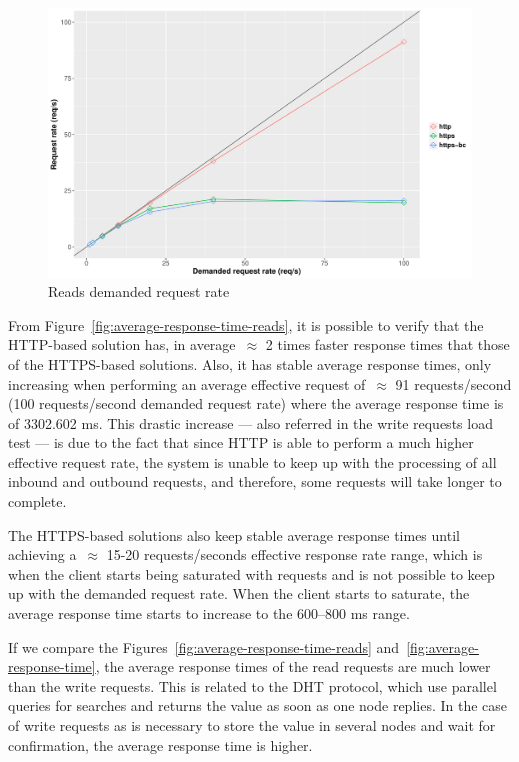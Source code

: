 \begin{figure}[h!]
  \centering
  \includegraphics[scale=0.4]{Figures/evaluation/request-rate-reads-linear-new.pdf}
  \caption{Reads demanded request rate}
  \label{fig:demanded-request-rate-reads}
\end{figure}

From Figure~\ref{fig:average-response-time-reads}, it is possible to verify that the HTTP-based solution has, in average~$\approx$ 2 times faster response times that those of the HTTPS-based solutions.
Also, it has stable average response times, only increasing when performing an average effective request of~$\approx$ 91 requests/second (100 requests/second demanded request rate) where the average response time is of 3302.602 ms.
This drastic increase — also referred in the write requests load test — is due to the fact that since HTTP is able to perform a much higher effective request rate, the system is unable to keep up with the processing of all inbound and outbound requests, and therefore, some requests will take longer to complete.

The HTTPS-based solutions also keep stable average response times until achieving a~$\approx$ 15-20 requests/seconds effective response rate range, which is when the client starts being saturated with requests and is not possible to keep up with the demanded request rate.
When the client starts to saturate, the average response time starts to increase to the 600–800 ms range.

If we compare the Figures~\ref{fig:average-response-time-reads} and~\ref{fig:average-response-time}, the average response times of the read requests are much lower than the write requests.
This is related to the DHT protocol, which use parallel queries for searches and returns the value as soon as one node replies.
In the case of write requests as is necessary to store the value in several nodes and wait for confirmation, the average response time is higher.


